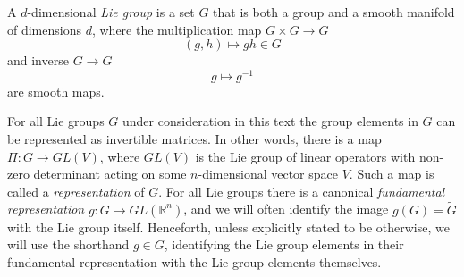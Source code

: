
A $d$-dimensional \textit{Lie group} is a set $G$ that is both a group and a smooth manifold of dimensions $d$, where the multiplication map $G\times G \to G$
\begin{equation}
(g,h) \mapsto gh \in G
\end{equation}
and inverse $G \to G$
\begin{equation}
g \mapsto g^{-1}
\end{equation}
are smooth maps.

For all Lie groups $G$ under consideration in this text the group elements in $G$ can be represented as invertible matrices. In other words, there is a map $\Pi : G \to GL(V)$, where $GL(V)$ is the Lie group of linear operators with non-zero determinant acting on some $n$-dimensional vector space $V$. Such a map is called a \textit{representation} of $G$. For all Lie groups there is a canonical \textit{fundamental representation} $g : G \to GL(\mathbb{R}^{n})$, and we will often identify the image $g(G) = \tilde{G}$ with the Lie group itself. Henceforth, unless explicitly stated to be otherwise, we will use the shorthand $g \in G$, identifying the Lie group elements in their fundamental representation with the Lie group elements themselves.

